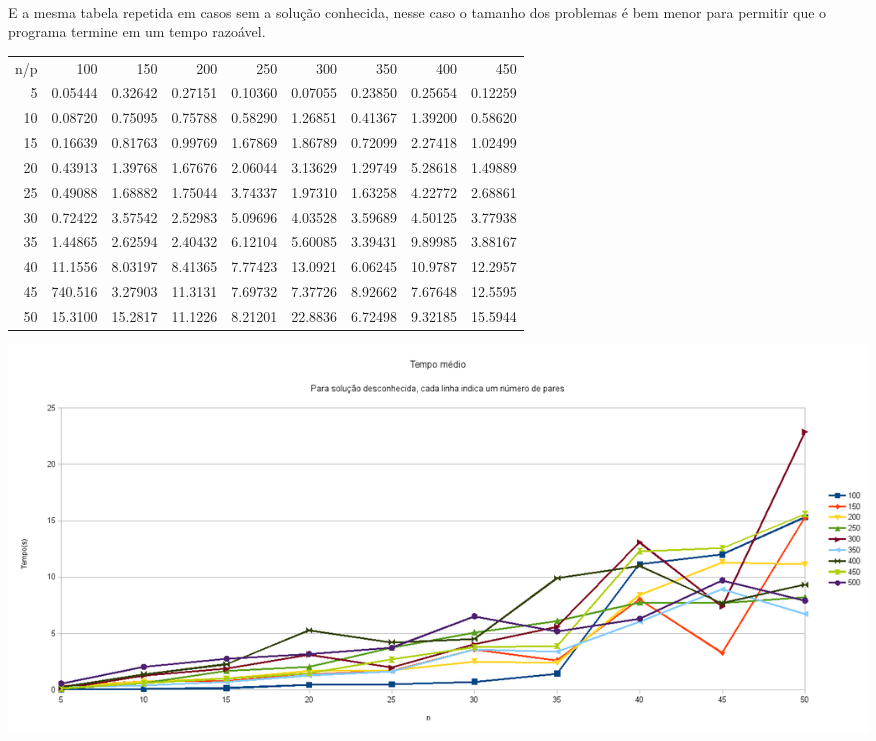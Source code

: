 \documentclass{article}
\begin{document}
\paragraph{} E a mesma tabela repetida em casos sem a solução
conhecida, nesse caso o tamanho dos problemas é bem menor para
permitir que o programa termine em um tempo razoável.
\begin{center}
\begin{tabular}{rrrrrrrrr}
n/p & 100 & 150 & 200 & 250 & 300 & 350 & 400 & 450 \\
5  & 0.05444 & 0.32642 & 0.27151 & 0.10360 & 0.07055 & 0.23850 & 0.25654 & 0.12259 \\
10 & 0.08720 & 0.75095 & 0.75788 & 0.58290 & 1.26851 & 0.41367 & 1.39200 & 0.58620\\
15 & 0.16639 & 0.81763 & 0.99769 & 1.67869 & 1.86789 & 0.72099 & 2.27418 & 1.02499\\
20 & 0.43913 & 1.39768 & 1.67676 & 2.06044 & 3.13629 & 1.29749 & 5.28618 & 1.49889\\
25 & 0.49088 & 1.68882 & 1.75044 & 3.74337 & 1.97310 & 1.63258 & 4.22772 & 2.68861\\
30 & 0.72422 & 3.57542 & 2.52983 & 5.09696 & 4.03528 & 3.59689 & 4.50125 & 3.77938\\
35 & 1.44865 & 2.62594 & 2.40432 & 6.12104 & 5.60085 & 3.39431 & 9.89985 & 3.88167\\
40 & 11.1556 & 8.03197 & 8.41365 & 7.77423 & 13.0921 & 6.06245 & 10.9787 & 12.2957\\
45 & 740.516 & 3.27903 & 11.3131 & 7.69732 & 7.37726 & 8.92662 & 7.67648 & 12.5595\\
50 & 15.3100 & 15.2817 & 11.1226 & 8.21201 & 22.8836 & 6.72498 & 9.32185 & 15.5944\\
\end{tabular}
\end{center}
\includegraphics[scale=0.4]{graphic_unknow}
\end{document}
